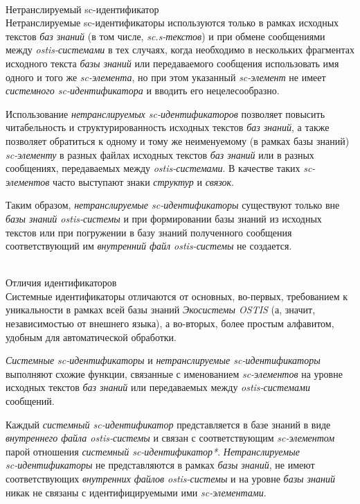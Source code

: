\begin{frame}{\\Нетранслируемый sc-идентификатор}
	\topline
	\justifying
	\vspace*{\fill}\\
	\footnotesize
	Нетранслируемые sc-идентификаторы используются только в рамках исходных текстов \textit{баз знаний} (в том числе, \textit{sc.s-текстов}) и при обмене сообщениями между \textit{ostis-системами} в тех случаях, когда необходимо в нескольких фрагментах исходного текста \textit{базы знаний} или передаваемого сообщения использовать имя одного и того же \textit{sc-элемента}, но при этом указанный \textit{sc-элемент} не имеет \textit{системного sc-идентификатора} и вводить его нецелесообразно.

	\bigskip
	Использование \textit{нетранслируемых sc-идентификаторов} позволяет повысить читабельность и структурированность исходных текстов \textit{баз знаний}, а также позволяет обратиться к одному и тому же неименуемому (в рамках базы знаний) \textit{sc-элементу} в разных файлах исходных текстов \textit{баз знаний} или в разных сообщениях, передаваемых между \textit{ostis-системами}. В качестве таких \textit{sc-элементов} часто выступают знаки \textit{структур} и \textit{связок}.

	\bigskip
	Таким образом, \textit{нетранслируемые sc-идентификаторы} существуют только вне \textit{базы знаний ostis-системы} и при формировании базы знаний из исходных текстов или при погружении в базу знаний полученного сообщения соответствующий им \textit{внутренний файл ostis-системы} не создается.
\end{frame}

\begin{frame}{\\Отличия идентификаторов}
	\topline
	\justifying
	\vspace*{\fill}\\
	\small
	Системные идентификаторы отличаются от основных, во-первых, требованием к уникальности в рамках всей базы знаний \textit{Экосистемы OSTIS} (а, значит, независимостью от внешнего языка), а во-вторых, более простым алфавитом, удобным для автоматической обработки.
	
	\bigskip
	\textit{Системные sc-идентификаторы} и \textit{нетранслируемые sc-идентификаторы} выполняют схожие функции, связанные с именованием \textit{sc-элементов} на уровне исходных текстов \textit{баз знаний} или передаваемых между \textit{ostis-системами} сообщений.

	\bigskip		
	Каждый \textit{системный sc-идентификатор} представляется в базе знаний в виде \textit{внутреннего файла ostis-системы} и связан с соответствующим \textit{sc-элементом} парой отношения \textit{системный \mbox{sc-идентификатор*}}. \textit{Нетранслируемые\\ sc-идентификаторы} не представляются в рамках \textit{базы знаний}, не имеют соответствующих \textit{внутренних файлов ostis-системы} и на уровне \textit{базы знаний} никак не связаны с идентифицируемыми ими \textit{sc-элементами}.
\end{frame}

